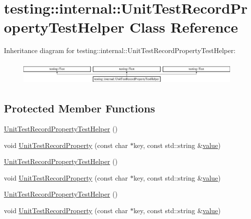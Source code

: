 \hypertarget{classtesting_1_1internal_1_1_unit_test_record_property_test_helper}{}\section{testing\+::internal\+::Unit\+Test\+Record\+Property\+Test\+Helper Class Reference}
\label{classtesting_1_1internal_1_1_unit_test_record_property_test_helper}
Inheritance diagram for testing\+::internal\+::Unit\+Test\+Record\+Property\+Test\+Helper\+:\begin{figure}[H]
\begin{center}
\leavevmode
\includegraphics[height=1.224044cm]{d2/dab/classtesting_1_1internal_1_1_unit_test_record_property_test_helper}
\end{center}
\end{figure}
\subsection*{Protected Member Functions}
\begin{DoxyCompactItemize}
\item 
\mbox{\hyperlink{classtesting_1_1internal_1_1_unit_test_record_property_test_helper_aa2bdfe52eb2aab5233ce9118917a4750}{Unit\+Test\+Record\+Property\+Test\+Helper}} ()
\item 
void \mbox{\hyperlink{classtesting_1_1internal_1_1_unit_test_record_property_test_helper_a9c5432d080faf13a1db6baff0a2944f4}{Unit\+Test\+Record\+Property}} (const char $\ast$key, const std\+::string \&\mbox{\hyperlink{_obj__test_2lib_2googletest-master_2googlemock_2test_2gmock-matchers__test_8cc_a337b8a670efc0b086ad3af163f3121b6}{value}})
\item 
\mbox{\hyperlink{classtesting_1_1internal_1_1_unit_test_record_property_test_helper_aa2bdfe52eb2aab5233ce9118917a4750}{Unit\+Test\+Record\+Property\+Test\+Helper}} ()
\item 
void \mbox{\hyperlink{classtesting_1_1internal_1_1_unit_test_record_property_test_helper_a9c5432d080faf13a1db6baff0a2944f4}{Unit\+Test\+Record\+Property}} (const char $\ast$key, const std\+::string \&\mbox{\hyperlink{_obj__test_2lib_2googletest-master_2googlemock_2test_2gmock-matchers__test_8cc_a337b8a670efc0b086ad3af163f3121b6}{value}})
\item 
\mbox{\hyperlink{classtesting_1_1internal_1_1_unit_test_record_property_test_helper_aa2bdfe52eb2aab5233ce9118917a4750}{Unit\+Test\+Record\+Property\+Test\+Helper}} ()
\item 
void \mbox{\hyperlink{classtesting_1_1internal_1_1_unit_test_record_property_test_helper_a9c5432d080faf13a1db6baff0a2944f4}{Unit\+Test\+Record\+Property}} (const char $\ast$key, const std\+::string \&\mbox{\hyperlink{_obj__test_2lib_2googletest-master_2googlemock_2test_2gmock-matchers__test_8cc_a337b8a670efc0b086ad3af163f3121b6}{value}})
\end{DoxyCompactItemize}
